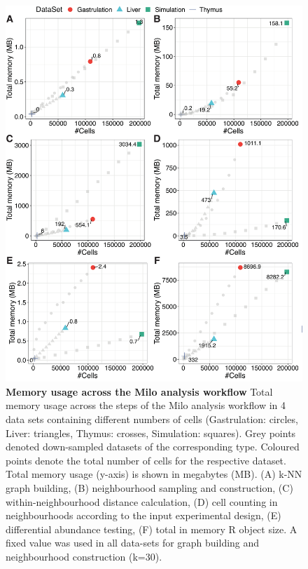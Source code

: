 \documentclass[
]{article}
\begin{document}
\begin{figure}
\centering
\includegraphics{suppl_figs/suppl_fig7.pdf}
\caption{\label{fig:sup-fig-7}\textbf{Memory usage across the Milo analysis workflow}
Total memory usage across the steps of the Milo analysis workflow in 4 data sets containing different numbers of cells (Gastrulation: circles, Liver: triangles, Thymus: crosses, Simulation: squares). Grey points denoted down-sampled datasets of the corresponding type. Coloured points denote the total number of cells for the respective dataset. Total memory usage (y-axis) is shown in megabytes (MB). (A) k-NN graph building, (B) neighbourhood sampling and construction, (C) within-neighbourhood distance calculation, (D) cell counting in neighbourhoods according to the input experimental design, (E) differential abundance testing, (F) total in memory R object size. A fixed value was used in all data-sets for graph building and neighbourhood construction (k=30).}
\end{figure}
\end{document}
